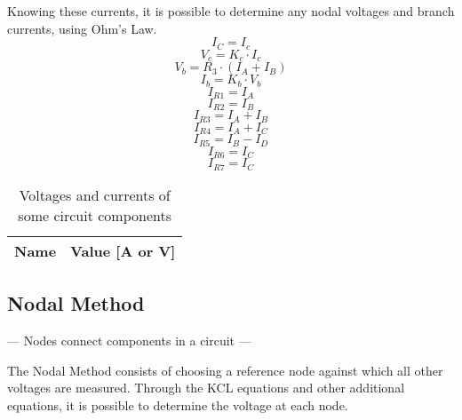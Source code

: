 Knowing these currents, it is possible to determine any nodal voltages and branch currents, using Ohm’s Law.
\begin{equation}
  I_C=I_c
\end{equation}
\begin{equation}
  V_c=K_c\cdot I_c
\end{equation}
\begin{equation}
  V_b=R_3\cdot (I_A+I_B)
\end{equation}
\begin{equation}
  I_b=K_b\cdot V_b
\end{equation}
\begin{equation}
  I_{R1}=I_A
\end{equation}
\begin{equation}
  I_{R2}=I_B
\end{equation}
\begin{equation}
  I_{R3}=I_A+I_B 
\end{equation}
\begin{equation}
  I_{R4}=I_A+I_C
\end{equation}
\begin{equation}
  I_{R5}=I_B - I_D
\end{equation}
\begin{equation}
  I_{R6}=I_C
\end{equation}
\begin{equation}
  I_{R7}=I_C
\end{equation}

\begin{table}[H]
  \centering
  \begin{tabular}{|l|r|}
    \hline    
    {\bf Name} & {\bf Value [A or V]} \\ \hline
    
  \end{tabular}
  \caption{Voltages and currents of some circuit components}
  \label{tab:valm}
\end{table}
 
\subsection{Nodal Method}

--- Nodes connect components in a circuit ---

The Nodal Method consists of choosing a reference node against which all other voltages are measured. Through the KCL equations and other additional equations, it is possible to determine the voltage at each node.

